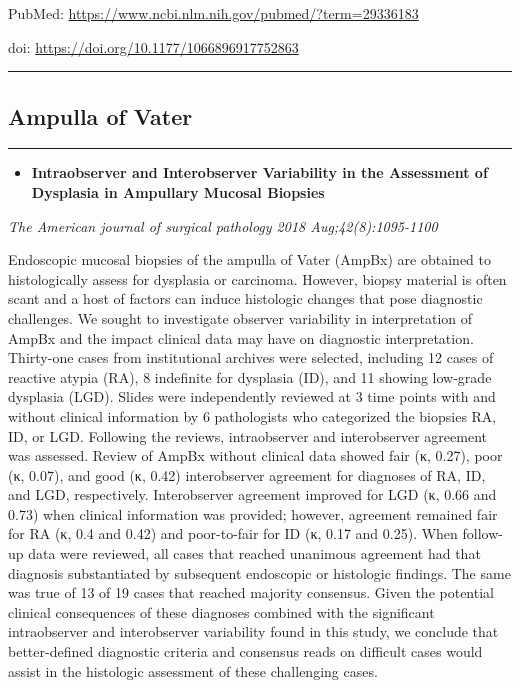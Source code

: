 \documentclass[]{article}
\providecommand{\tightlist}{%
  \setlength{\itemsep}{0pt}\setlength{\parskip}{0pt}}
\begin{document}
PubMed: \url{https://www.ncbi.nlm.nih.gov/pubmed/?term=29336183}

doi: \url{https://doi.org/10.1177/1066896917752863}

{}

{}

\begin{center}\rule{0.5\linewidth}{\linethickness}\end{center}

\hypertarget{ampulla-of-vater}{%
\subsection{Ampulla of Vater}\label{ampulla-of-vater}}

\begin{center}\rule{0.5\linewidth}{\linethickness}\end{center}

\begin{itemize}
\tightlist
\item
  \textbf{Intraobserver and Interobserver Variability in the Assessment
  of Dysplasia in Ampullary Mucosal Biopsies}
\end{itemize}

\emph{The American journal of surgical pathology 2018
Aug;42(8):1095-1100}

Endoscopic mucosal biopsies of the ampulla of Vater (AmpBx) are obtained
to histologically assess for dysplasia or carcinoma. However, biopsy
material is often scant and a host of factors can induce histologic
changes that pose diagnostic challenges. We sought to investigate
observer variability in interpretation of AmpBx and the impact clinical
data may have on diagnostic interpretation. Thirty-one cases from
institutional archives were selected, including 12 cases of reactive
atypia (RA), 8 indefinite for dysplasia (ID), and 11 showing low-grade
dysplasia (LGD). Slides were independently reviewed at 3 time points
with and without clinical information by 6 pathologists who categorized
the biopsies RA, ID, or LGD. Following the reviews, intraobserver and
interobserver agreement was assessed. Review of AmpBx without clinical
data showed fair (κ, 0.27), poor (κ, 0.07), and good (κ, 0.42)
interobserver agreement for diagnoses of RA, ID, and LGD, respectively.
Interobserver agreement improved for LGD (κ, 0.66 and 0.73) when
clinical information was provided; however, agreement remained fair for
RA (κ, 0.4 and 0.42) and poor-to-fair for ID (κ, 0.17 and 0.25). When
follow-up data were reviewed, all cases that reached unanimous agreement
had that diagnosis substantiated by subsequent endoscopic or histologic
findings. The same was true of 13 of 19 cases that reached majority
consensus. Given the potential clinical consequences of these diagnoses
combined with the significant intraobserver and interobserver
variability found in this study, we conclude that better-defined
diagnostic criteria and consensus reads on difficult cases would assist
in the histologic assessment of these challenging cases.
\end{document}
